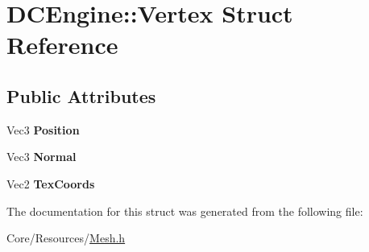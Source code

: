 \hypertarget{structDCEngine_1_1Vertex}{\section{D\-C\-Engine\-:\-:Vertex Struct Reference}
\label{structDCEngine_1_1Vertex}
}
\subsection*{Public Attributes}
\begin{DoxyCompactItemize}
\item 
\hypertarget{structDCEngine_1_1Vertex_a470dca000c9f1080fbbcbde3f15bde8d}{Vec3 {\bfseries Position}}\label{structDCEngine_1_1Vertex_a470dca000c9f1080fbbcbde3f15bde8d}

\item 
\hypertarget{structDCEngine_1_1Vertex_ac4eaacf2b0740a6f621c3d37a1d5dad4}{Vec3 {\bfseries Normal}}\label{structDCEngine_1_1Vertex_ac4eaacf2b0740a6f621c3d37a1d5dad4}

\item 
\hypertarget{structDCEngine_1_1Vertex_a46126133c1f5cb63f4e8bc62d4ef11d8}{Vec2 {\bfseries Tex\-Coords}}\label{structDCEngine_1_1Vertex_a46126133c1f5cb63f4e8bc62d4ef11d8}

\end{DoxyCompactItemize}


The documentation for this struct was generated from the following file\-:\begin{DoxyCompactItemize}
\item 
Core/\-Resources/\hyperlink{Mesh_8h}{Mesh.\-h}\end{DoxyCompactItemize}
